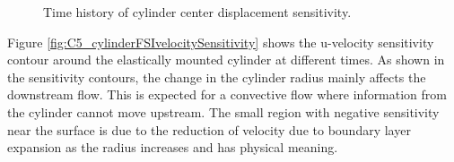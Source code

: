 \begin{figure}[H]
    \centering
    \quad
    \caption{Time history of cylinder center displacement sensitivity.}
    \label{fig:C5_cylinderDisplacementSensitivity}
\end{figure}
%
Figure \ref{fig:C5_cylinderFSIvelocitySensitivity} shows the u-velocity sensitivity contour around the elastically mounted cylinder at different times. As shown in the sensitivity contours, the change in the cylinder radius mainly affects the downstream flow. This is expected for a convective flow where information from the cylinder cannot move upstream. The small region with negative sensitivity near the surface is due to the reduction of velocity due to boundary layer expansion as the radius increases and has physical meaning.
%
